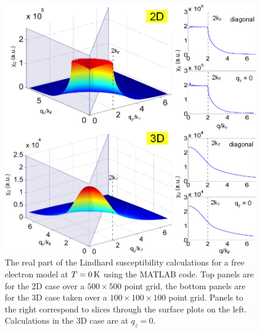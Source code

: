 \begin{figure}[htbp]
    \begin{center}
        \includegraphics[scale=0.9]{Chapter3-dHvABaFe2P2/Figures/AngleDepMeasurements/SusceptibilityFreeElectron/SusceptibilityFreeElectron}
        \caption{The real part of the Lindhard susceptibility calculations for a free electron model at $T=\unit[0]{K}$ using the MATLAB  code. Top panels are for the 2D case over a $500\times500$ point grid, the bottom panels are for the 3D case taken over a $100\times100\times100$ point grid. Panels to the right correspond to slices through the surface plots on the left. Calculations in the 3D case are at $q_z=0$.}
        \label{Fig:3:FreeElectronSusceptibility}
    \end{center}
\end{figure}


